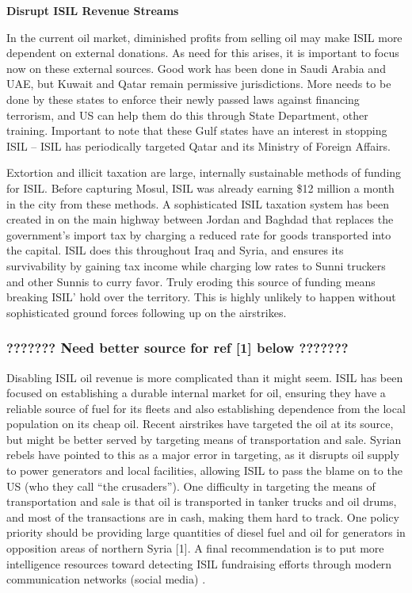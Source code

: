 \documentclass{report}
\begin{document}
\textbf{Disrupt ISIL Revenue Streams}

In the current oil market, diminished profits from selling oil may make ISIL more dependent on external donations. As need for this arises, it is important to focus now on these external sources. Good work has been done in Saudi Arabia and UAE, but Kuwait and Qatar remain permissive jurisdictions. More needs to be done by these states to enforce their newly passed laws against financing terrorism, and US can help them do this through State Department, other training. Important to note that these Gulf states have an interest in stopping ISIL – ISIL has periodically targeted Qatar and its Ministry of Foreign Affairs.

Extortion and illicit taxation are large, internally sustainable methods of funding for ISIL. Before capturing Mosul, ISIL was already earning \$12 million a month in the city from these methods. A sophisticated ISIL taxation system has been created in on the main highway between Jordan and Baghdad that replaces the government’s import tax by charging a reduced rate for goods transported into the capital. ISIL does this throughout Iraq and Syria, and ensures its survivability by gaining tax income while charging low rates to Sunni truckers and other Sunnis to curry favor. Truly eroding this source of funding means breaking ISIL’ hold over the territory. This is highly unlikely to happen without sophisticated ground forces following up on the airstrikes. 

\subsubsection{???????  Need better source for ref [1]  below  ???????}


Disabling ISIL oil revenue is more complicated than it might seem. ISIL has been focused on establishing a durable internal market for oil, ensuring they have a reliable source of fuel for its fleets and also establishing dependence from the local population on its cheap oil. Recent airstrikes have targeted the oil at its source, but might be better served by targeting means of transportation and sale. Syrian rebels have pointed to this as a major error in targeting, as it disrupts oil supply to power generators and local facilities, allowing ISIL to pass the blame on to the US (who they call \enquote{the crusaders}). One difficulty in targeting the means of transportation and sale is that oil is transported in tanker trucks and oil drums, and most of the transactions are in cash, making them hard to track. One policy priority should be providing large quantities of diesel fuel and oil for generators in opposition areas of northern Syria [1].
A final recommendation is to put more intelligence resources toward detecting ISIL fundraising efforts through modern communication networks (social media) \cite{Report2015}.
\end{document}
